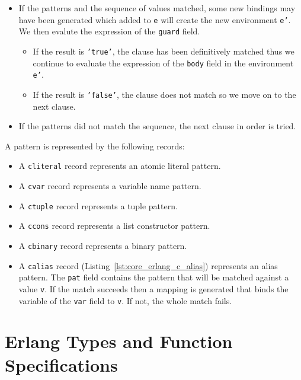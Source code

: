 \begin{itemize}
  \item If the patterns and the sequence of values matched, some new bindings
    may have been generated which added to \texttt{e} will create the new
    environment \texttt{e'}. We then evalute the expression of the
    \texttt{guard} field. 
    \begin{itemize}
      \item If the result is \texttt{'true'}, the clause has been definitively
        matched thus we continue to evaluate the expression of the
        \texttt{body} field in the environment \texttt{e'}.
      \item If the result is \texttt{'false'}, the clause does not match so we
        move on to the next clause.
    \end{itemize}
  \item If the patterns did not match the sequence, the next clause in order is
    tried.
\end{itemize}

A pattern is represented by the following records:

\begin{itemize}
  \item A \texttt{c\textunderscore literal} record represents an atomic literal pattern.
  \item A \texttt{c\textunderscore var} record represents a variable name pattern.
  \item A \texttt{c\textunderscore tuple} record represents a tuple pattern.
  \item A \texttt{c\textunderscore cons} record represents a list constructor pattern.
  \item A \texttt{c\textunderscore binary} record represents a binary pattern.
  \item A \texttt{c\textunderscore alias} record (Listing~\ref{lst:core_erlang_c_alias}) represents an alias pattern.
    The \texttt{pat} field contains the pattern that will be matched against a
    value \texttt{v}. If the match succeeds then a mapping is generated that
    binds the variable of the \texttt{var} field to \texttt{v}. If not, the
    whole match fails.
\end{itemize}



\section{Erlang Types and Function Specifications}\label{sec:erlang_types_specs}

